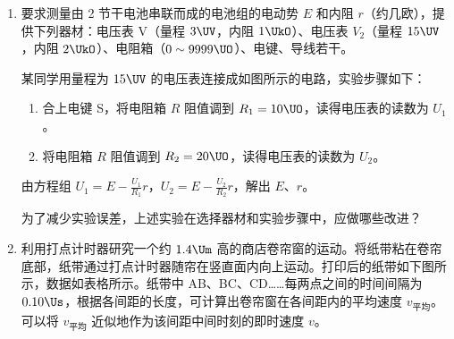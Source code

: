 \documentclass[\gkver]{gaokaozhenti}
\begin{document}
\begin{enumerate}
\item
要求测量由 2 节干电池串联而成的电池组的电动势 $E$ 和内阻 $r$（约几欧），提供下列器材：电压表 V（量程 $3\UV$，内阻 $1\UkO$）、电压表 $V_{2}$（量程 $15\UV$，内阻 $2\UkO$）、电阻箱（$0\sim9999\UO$）、电键、导线若干。

某同学用量程为 $15\UV$ 的电压表连接成如图所示的电路，实验步骤如下：
\begin{enumerate}
	\item
	合上电键 S，将电阻箱 $R$ 阻值调到 $R_{1}=10\UO$，读得电压表的读数为 $U_{1}$。
	\item
	将电阻箱 $R$ 阻值调到 $R_{2}=20\UO$，读得电压表的读数为 $U_{2}$。
\end{enumerate}

由方程组 $U_{1}=E-\frac{U_{1}}{R_{1}}r$，$U_{2}=E-\frac{U_{2}}{R_{2}}r$，解出 $E$、$r$。

为了减少实验误差，上述实验在选择器材和实验步骤中，应做哪些改进？

\onepicture[align=right, w=3.82cm]{}


\item
利用打点计时器研究一个约 $1.4\Um$ 高的商店卷帘窗的运动。将纸带粘在卷帘底部，纸带通过打点计时器随帘在竖直面内向上运动。打印后的纸带如下图所示，数据如表格所示。纸带中 AB、BC、CD……每两点之间的时间间隔为 $0.10\Us$，根据各间距的长度，可计算出卷帘窗在各间距内的平均速度 $v_{\text{平均}}$。可以将 $v_{\text{平均}}$ 近似地作为该间距中间时刻的即时速度 $v$。


\end{enumerate}
\end{document}
